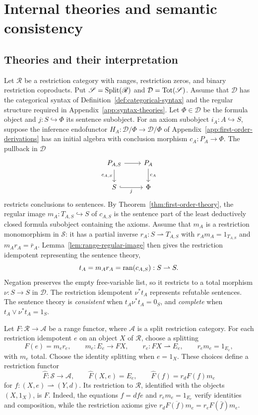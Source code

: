 \section{Internal theories and semantic consistency}\label{sec:internal-theories}

\subsection{Theories and their interpretation}

Let $\mathscr R$ be a restriction category with ranges, restriction
zeros, and binary restriction coproducts. Put
$\mathscr S=\operatorname{Split}(\mathscr R)$ and $\mathcal D=\operatorname{Tot}(\mathscr S)$.
Assume that $\mathcal D$ has the categorical syntax of
Definition~\ref{def:categorical-syntax} and the regular structure
required in Appendix~\ref{app:syntax-theories}.
Let $\Phi\in\mathcal D$ be the formula object and
$j:S\hookrightarrow\Phi$ its sentence subobject. For an axiom
subobject $i_A:A\hookrightarrow S$, suppose the inference
endofunctor $H_A:\mathcal D/\Phi\to\mathcal D/\Phi$ of
Appendix~\ref{app:first-order-derivations} has an initial algebra
with conclusion morphism $c_A:P_A\to\Phi$.
The pullback in $\mathcal D$
\[
\begin{tikzcd}
 P_{A,S}\arrow[r]\arrow[d,"c_{A,S}"'] & P_A\arrow[d,"c_A"]\\
 S\arrow[r,hook,"j"'] & \Phi
\end{tikzcd}
\]
restricts conclusions to sentences. By
Theorem~\ref{thm:first-order-theory}, the regular image
$m_A:T_{A,S}\hookrightarrow S$ of $c_{A,S}$ is the sentence part
of the least deductively closed formula subobject containing the
axioms. Assume that $m_A$ is a restriction monomorphism in
$\mathscr S$: it has a partial inverse
$r_A:S\rightharpoonup T_{A,S}$ with
$r_A m_A=1_{T_{A,S}}$ and $m_A r_A=\bar r_A$.
Lemma~\ref{lem:range-regular-image} then gives the restriction
idempotent representing the sentence theory,
\[
 t_A=m_A r_A=\operatorname{ran}(c_{A,S}):S\rightharpoonup S.
\]
Negation preserves the empty free-variable list, so it restricts
to a total morphism $\nu:S\to S$ in $\mathcal D$.
The restriction idempotent $\nu^*t_A$ represents refutable sentences.
The sentence theory is \emph{consistent} when
$t_A\nu^*t_A=0_S$, and \emph{complete} when
$t_A\vee\nu^*t_A=1_S$.

Let $F:\mathscr R\to\mathcal A$ be a range functor, where
$\mathcal A$ is a split restriction category. For each restriction
idempotent $e$ on an object $X$ of $\mathscr R$, choose a splitting
\[
 F(e)=m_e r_e,\qquad
 m_e:E_e\to FX,\qquad r_e:FX\rightharpoonup E_e,\qquad
 r_e m_e=1_{E_e},
\]
with $m_e$ total. Choose the identity splitting when $e=1_X$.
These choices define a restriction functor
\[
 \widehat F:\mathscr S\longrightarrow\mathcal A,\qquad
 \widehat F(X,e)=E_e,\qquad
 \widehat F(f)=r_d F(f)m_e
\]
for $f:(X,e)\rightharpoonup(Y,d)$. Its restriction to
$\mathscr R$, identified with the objects $(X,1_X)$, is $F$.
Indeed, the equations $f=dfe$ and $r_e m_e=1_{E_e}$ verify
identities and composition, while the restriction axioms give
$\overline{r_d F(f)m_e}=r_e F(\bar f)m_e$.

